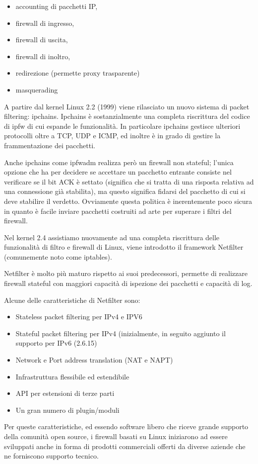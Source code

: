\begin{itemize}
    \item accounting di pacchetti IP,
    \item firewall di ingresso,
    \item firewall di uscita,
    \item firewall di inoltro,
    \item redirezione (permette proxy trasparente)
    \item masquerading
\end{itemize}
A partire dal kernel Linux 2.2 (1999) viene rilasciato un nuovo sistema di packet
filtering: ipchains. Ipchains \`e sostanzialmente una completa
riscrittura del codice di ipfw di cui espande le funzionalità.  In particolare
ipchains gestisce ulteriori protocolli oltre a TCP, UDP e ICMP, ed inoltre è
in grado di gestire la frammentazione dei pacchetti.

Anche ipchains come ipfwadm realizza però un firewall non stateful; l'unica
opzione che ha per decidere se accettare un pacchetto entrante consiste nel
verificare se il bit ACK \`e settato (significa che si tratta di una risposta
relativa ad una connessione già stabilita), ma questo significa fidarsi del
pacchetto di cui si deve stabilire il verdetto.  Ovviamente questa politica è
inerentemente poco sicura in quanto è facile inviare pacchetti costruiti ad
arte per superare i filtri del firewall.

Nel kernel 2.4 assistiamo nuovamente ad una completa riscrittura delle
funzionalità di filtro e firewall di Linux, viene introdotto il framework 
Netfilter (comunemente noto come iptables).

Netfilter è molto più maturo rispetto ai suoi predecessori, permette di
realizzare firewall stateful con maggiori capacità di ispezione dei pacchetti
e capacità di log.

Alcune delle caratteristiche di Netfilter sono:

\begin{itemize}
    \item Stateless packet filtering per IPv4 e IPV6
    \item Stateful packet filtering per IPv4 (inizialmente, in seguito
        aggiunto il supporto per IPv6 (2.6.15)
    \item Network e Port address translation (NAT e NAPT)
    \item Infrastruttura flessibile ed estendibile
    \item API per estensioni di terze parti
    \item Un gran numero di plugin/moduli
\end{itemize}
Per queste caratteristiche, ed essendo software libero che riceve
grande supporto della comunità open source, i firewall basati su Linux
iniziarono ad essere sviluppati anche in forma di prodotti commerciali offerti
da diverse aziende che ne forniscono supporto tecnico.

